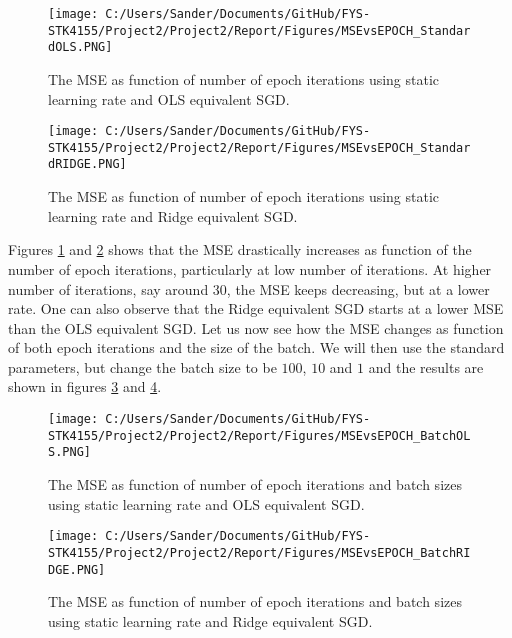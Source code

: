 \documentclass[12pt,a4paper]{article}
\begin{document}
\begin{figure}[H]
\centering
\texttt{[image: C:/Users/Sander/Documents/GitHub/FYS-STK4155/Project2/Project2/Report/Figures/MSEvsEPOCH\_StandardOLS.PNG]}
\caption{\label{fig:MSEvsEPOCHstandard} The MSE as function of number of epoch iterations using static learning rate and OLS equivalent SGD.}
\end{figure}

\begin{figure}[H]
\centering
\texttt{[image: C:/Users/Sander/Documents/GitHub/FYS-STK4155/Project2/Project2/Report/Figures/MSEvsEPOCH\_StandardRIDGE.PNG]}
\caption{\label{fig:MSEvsEPOCHstandardRidge} The MSE as function of number of epoch iterations using static learning rate and Ridge equivalent SGD.}
\end{figure}

\noindent Figures \ref{fig:MSEvsEPOCHstandard} and \ref{fig:MSEvsEPOCHstandardRidge} shows that the MSE drastically increases as function of the number of epoch iterations, particularly at low number of iterations. At higher number of iterations, say around 30, the MSE keeps decreasing, but at a lower rate. One can also observe that the Ridge equivalent SGD starts at a lower MSE than the OLS equivalent SGD. Let us now see how the MSE changes as function of both epoch iterations and the size of the batch. We will then use the standard parameters, but change the batch size to be $100$, $10$ and $1$ and the results are shown in figures \ref{fig:MSEvsEPOCHbatchOLS} and \ref{fig:MSEvsEPOCHbatchRIDGE}.

\begin{figure}[H]
\centering
\texttt{[image: C:/Users/Sander/Documents/GitHub/FYS-STK4155/Project2/Project2/Report/Figures/MSEvsEPOCH\_BatchOLS.PNG]}
\caption{\label{fig:MSEvsEPOCHbatchOLS} The MSE as function of number of epoch iterations and batch sizes using static learning rate and OLS equivalent SGD.}
\end{figure}

\begin{figure}[H]
\centering
\texttt{[image: C:/Users/Sander/Documents/GitHub/FYS-STK4155/Project2/Project2/Report/Figures/MSEvsEPOCH\_BatchRIDGE.PNG]}
\caption{\label{fig:MSEvsEPOCHbatchRIDGE} The MSE as function of number of epoch iterations and batch sizes using static learning rate and Ridge equivalent SGD.}
\end{figure}
\end{document}
